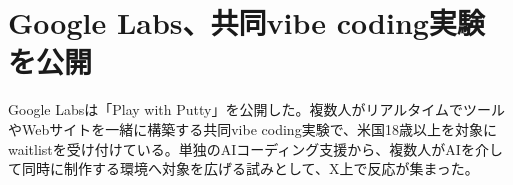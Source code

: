 \section{Google Labs、共同vibe coding実験を公開}
Google Labsは「Play with Putty」を公開した。複数人がリアルタイムでツールやWebサイトを一緒に構築する共同vibe coding実験で、米国18歳以上を対象にwaitlistを受け付けている。単独のAIコーディング支援から、複数人がAIを介して同時に制作する環境へ対象を広げる試みとして、X上で反応が集まった。
